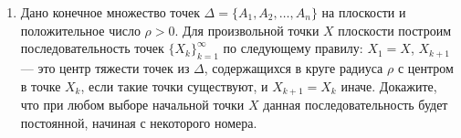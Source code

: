 \documentclass[11pt, a4paper]{article}
\begin{document}
\begin{enumerate}
\item Дано конечное множество точек $\Delta = \{ A_1, A_2, \hdots, A_n \}$ на плоскости и положительное число $\rho > 0$. Для произвольной точки $X$ плоскости построим последовательность точек $\{X_k\}_{k=1}^{\infty}$ по следующему правилу: $X_1 = X$, $X_{k+1}$ --- это центр тяжести точек из $\Delta$, содержащихся в круге радиуса $\rho$ с центром в точке $X_k$, если такие точки существуют, и $X_{k+1} = X_k$ иначе. Докажите, что при любом выборе начальной точки $X$ данная последовательность будет постоянной, начиная с некоторого номера.

\end{enumerate}
\end{document}
